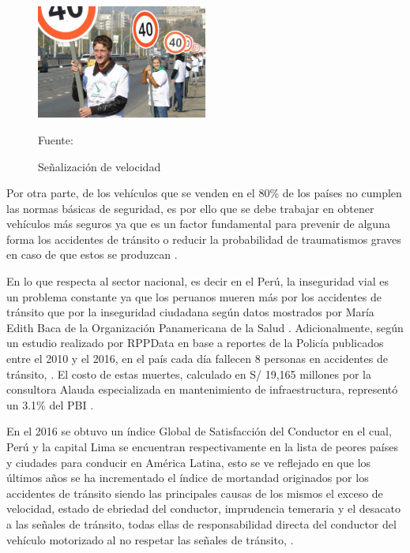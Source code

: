 	\vskip 0.15cm
	\begin{figure}[H]
	\begin{center}
	\includegraphics[width=0.5\textwidth]{images/intro/velocidad}
	\end{center}
	\begin{center}
	\caption{\small{Señalización de velocidad}}
	{\small{Fuente: \cite{OMS}}}
	\end{center}
	\vspace{-1.5em}
	\end{figure}
	
	Por otra parte, de los vehículos que se venden en el 80\% de los países no cumplen las normas básicas de seguridad, es por ello que se debe trabajar en obtener vehículos más seguros ya que es un factor fundamental para prevenir de alguna forma los accidentes de tránsito o reducir la probabilidad de traumatismos graves en caso de que estos se produzcan \citep{OMS}.
	
	\vskip 0.15cm
	En lo que respecta al sector nacional, es decir en el Perú, la inseguridad vial es un problema constante ya que los peruanos mueren más por los accidentes de tránsito que por la inseguridad ciudadana según datos mostrados por María Edith Baca de la Organización Panamericana de la Salud \citep{OPS}. Adicionalmente, según un estudio realizado por RPPData en base a reportes de la Policía publicados entre el 2010 y el 2016, en el país cada día fallecen 8 personas en accidentes de tránsito, \citep{RPPData}. El costo de estas muertes, calculado en S/ 19,165 millones por la consultora Alauda especializada en mantenimiento de infraestructura, representó un 3.1\% del PBI \citep{Gestion2}.  
	
	
	\vskip 0.15cm
	En el 2016 se obtuvo un índice Global de Satisfacción del Conductor \citep{CNN} en el cual, Perú y la capital Lima se encuentran respectivamente en la lista de peores países y ciudades para conducir en América Latina, esto se ve reflejado en que los últimos años se ha incrementado el índice de mortandad originados por los accidentes de tránsito siendo las principales causas de los mismos el exceso de velocidad, estado de ebriedad del conductor, imprudencia temeraria y el desacato a las señales de tránsito, todas ellas de responsabilidad directa del conductor del vehículo motorizado al no respetar las señales de tránsito, \citep{SUTRAN}. 
	
